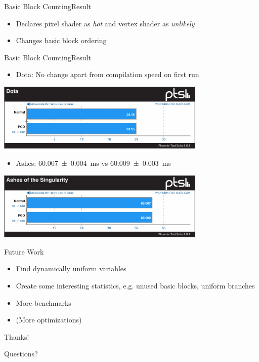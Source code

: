 \documentclass[xcolor={usenames,dvipsnames}, aspectratio=169, 12pt]{beamer}
\begin{document}
{\framelogo{\centering}
\begin{frame}{Basic Block Counting}{Result}
\begin{itemize}
	\item Declares pixel shader as \emph{hot} and vertex shader as \emph{unlikely}
	\item Changes basic block ordering
\end{itemize}
\end{frame}}

{\framelogo{\centering}
\begin{frame}{Basic Block Counting}{Result}
\begin{itemize}
	\item Dota: No change apart from compilation speed on first run
\end{itemize}
\includegraphics[width=10cm]{figures/dota.pdf}
\begin{itemize}
	\item Ashes: \SI{60.007 \pm 0.004}{\milli\second} vs \SI{60.009 \pm 0.003}{\milli\second}
\end{itemize}
\includegraphics[width=10cm]{figures/ashes.pdf}
\end{frame}}

{\framelogo{\centering}
\begin{frame}{Future Work}
\begin{itemize}
	\item Find dynamically uniform variables
	\item Create some interesting statistics, e.g. unused basic blocks, uniform branches
	\item More benchmarks
	\item (More optimizations)
\end{itemize}
\end{frame}}

\begin{tumplainframe}{Thanks!}
\begin{center}
	\Huge Questions?
\end{center}
\end{tumplainframe}
\end{document}

